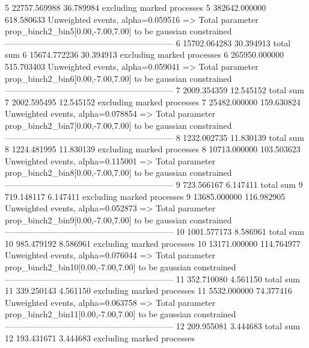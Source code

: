 5          22757.569988    36.789984       excluding marked processes    
5          382642.000000   618.580633      Unweighted events, alpha=0.059516
  => Total parameter prop_binch2_bin5[0.00,-7.00,7.00] to be gaussian constrained
------------------------------------------------------------
6          15702.064283    30.394913       total sum                     
6          15674.772236    30.394913       excluding marked processes    
6          265950.000000   515.703403      Unweighted events, alpha=0.059041
  => Total parameter prop_binch2_bin6[0.00,-7.00,7.00] to be gaussian constrained
------------------------------------------------------------
7          2009.354359     12.545152       total sum                     
7          2002.595495     12.545152       excluding marked processes    
7          25482.000000    159.630824      Unweighted events, alpha=0.078854
  => Total parameter prop_binch2_bin7[0.00,-7.00,7.00] to be gaussian constrained
------------------------------------------------------------
8          1232.002735     11.830139       total sum                     
8          1224.481995     11.830139       excluding marked processes    
8          10713.000000    103.503623      Unweighted events, alpha=0.115001
  => Total parameter prop_binch2_bin8[0.00,-7.00,7.00] to be gaussian constrained
------------------------------------------------------------
9          723.566167      6.147411        total sum                     
9          719.148117      6.147411        excluding marked processes    
9          13685.000000    116.982905      Unweighted events, alpha=0.052873
  => Total parameter prop_binch2_bin9[0.00,-7.00,7.00] to be gaussian constrained
------------------------------------------------------------
10         1001.577173     8.586961        total sum                     
10         985.479192      8.586961        excluding marked processes    
10         13171.000000    114.764977      Unweighted events, alpha=0.076044
  => Total parameter prop_binch2_bin10[0.00,-7.00,7.00] to be gaussian constrained
------------------------------------------------------------
11         352.710080      4.561150        total sum                     
11         339.250143      4.561150        excluding marked processes    
11         5532.000000     74.377416       Unweighted events, alpha=0.063758
  => Total parameter prop_binch2_bin11[0.00,-7.00,7.00] to be gaussian constrained
------------------------------------------------------------
12         209.955081      3.444683        total sum                     
12         193.431671      3.444683        excluding marked processes    
